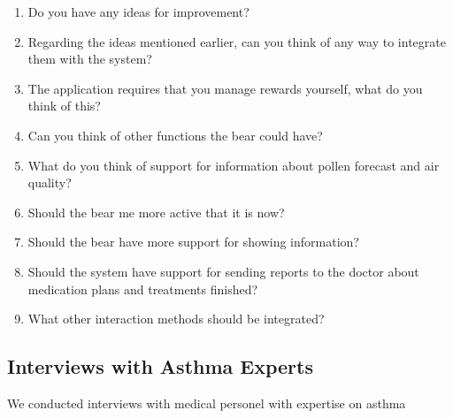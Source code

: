 \begin{enumerate}
	\item{Do you have any ideas for improvement?}
	\item{Regarding the ideas mentioned earlier, can you think of any way to integrate them with the system?}
	\item{The application requires that you manage rewards yourself, what do you think of this?}
	\item{Can you think of other functions the bear could have?}
	\item{What do you think of support for information about pollen forecast and air quality?}
	\item{Should the bear me more active that it is now?}
	\item{Should the bear have more support for showing information?}
	\item{Should the system have support for sending reports to the doctor about medication plans and treatments finished?}
	\item{What other interaction methods should be integrated?}
\end{enumerate}


\subsection{Interviews with Asthma Experts}

We conducted interviews with medical personel with expertise on asthma